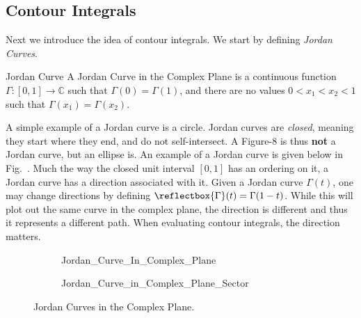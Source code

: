 \documentclass[crop=false,class=book,oneside]{standalone}
\begin{document}
        \subsection{Contour Integrals}
            Next we introduce the idea of contour integrals.
            We start by defining \textit{Jordan Curves}.
            \begin{ldefinition}{Jordan Curve}
                A Jordan Curve in the Complex Plane is a
                continuous function
                $\Gamma:[0,1]\rightarrow\mathbb{C}$ such
                that $\Gamma(0)=\Gamma(1)$, and there are
                no values $0<x_{1}<x_{2}<1$ such that
                $\Gamma(x_{1})=\Gamma(x_{2})$.
            \end{ldefinition}
            A simple example of a Jordan curve is a circle. Jordan
            curves are \textit{closed}, meaning they start where
            they end, and do not self-intersect. A Figure-8 is
            thus \textbf{not} a Jordan curve, but an ellipse is.
            An example of a Jordan curve is given below in
            Fig.~.
            Much the way the closed unit interval $[0,1]$ has an ordering
            on it, a Jordan curve has a direction associated with it. Given
            a Jordan curve $\Gamma(t)$, one may change directions by defining
            $\reflectbox{\ensuremath{\Gamma}}(t)=\Gamma(1-t)$.
            While this will plot out the same
            curve in the complex plane, the direction is different and thus
            it represents a different path. When evaluating contour
            integrals, the direction matters.
            \begin{figure}[H]
                \captionsetup{type=figure}
                \centering
                \begin{subfigure}[b]{0.49\textwidth}
                    \centering
                    {Jordan_Curve_In_Complex_Plane}
                    \label{fig:Diff_Theory_Ex_of_Smooth_Jordan_Curve}
                \end{subfigure}
                \begin{subfigure}[b]{0.49\textwidth}
                    \centering
                    {Jordan_Curve_in_Complex_Plane_Sector}
                    \label{fig:Diff_Theory_Ex_of_Jordan_Curve_Sector}
                \end{subfigure}
                \caption{Jordan Curves in the Complex Plane.}
                \label{fig:Diff_Theory_Ex_of_Jordan_Curve}
            \end{figure}
\end{document}
